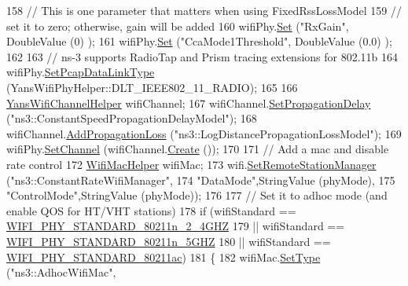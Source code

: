 \begin{DoxyCode}
158   \textcolor{comment}{// This is one parameter that matters when using FixedRssLossModel}
159   \textcolor{comment}{// set it to zero; otherwise, gain will be added}
160   wifiPhy.\hyperlink{classns3_1_1WifiPhyHelper_a2527d6d7b29f717fd7436166c5f05f1a}{Set} (\textcolor{stringliteral}{"RxGain"}, DoubleValue (0) ); 
161   wifiPhy.\hyperlink{classns3_1_1WifiPhyHelper_a2527d6d7b29f717fd7436166c5f05f1a}{Set} (\textcolor{stringliteral}{"CcaMode1Threshold"}, DoubleValue (0.0) );
162 
163   \textcolor{comment}{// ns-3 supports RadioTap and Prism tracing extensions for 802.11b}
164   wifiPhy.\hyperlink{classns3_1_1WifiPhyHelper_ae4b90e90f6e78a19c1b7fdf08b270218}{SetPcapDataLinkType} (YansWifiPhyHelper::DLT\_IEEE802\_11\_RADIO); 
165 
166   \hyperlink{classns3_1_1YansWifiChannelHelper}{YansWifiChannelHelper} wifiChannel;
167   wifiChannel.\hyperlink{classns3_1_1YansWifiChannelHelper_a6b452ba53ccaee6ca000cc72ed9ea0fa}{SetPropagationDelay} (\textcolor{stringliteral}{"ns3::ConstantSpeedPropagationDelayModel"});
168   wifiChannel.\hyperlink{classns3_1_1YansWifiChannelHelper_a71c64d54e148b43698c65736e1c77156}{AddPropagationLoss} (\textcolor{stringliteral}{"ns3::LogDistancePropagationLossModel"});
169   wifiPhy.\hyperlink{classns3_1_1YansWifiPhyHelper_ad2e9a27587dd4ff320435c93cc2676de}{SetChannel} (wifiChannel.\hyperlink{classns3_1_1YansWifiChannelHelper_a0532e292ab9452f3cf630c848708e563}{Create} ());
170 
171   \textcolor{comment}{// Add a mac and disable rate control}
172   \hyperlink{classns3_1_1WifiMacHelper}{WifiMacHelper} wifiMac;
173   wifi.\hyperlink{classns3_1_1WifiHelper_a3d01b178aeb2de246ab5a3aa5638ce24}{SetRemoteStationManager} (\textcolor{stringliteral}{"ns3::ConstantRateWifiManager"},
174                                 \textcolor{stringliteral}{"DataMode"},StringValue (phyMode),
175                                 \textcolor{stringliteral}{"ControlMode"},StringValue (phyMode));
176 
177   \textcolor{comment}{// Set it to adhoc mode (and enable QOS for HT/VHT stations)}
178   \textcolor{keywordflow}{if} (wifiStandard == \hyperlink{group__wifi_gga1299834f4e1c615af3ca738033b76a49a6e449a5ca14fc7c0eb36064ce04a5192}{WIFI\_PHY\_STANDARD\_80211n\_2\_4GHZ}
179       || wifiStandard == \hyperlink{group__wifi_gga1299834f4e1c615af3ca738033b76a49aaabe94a0be4668583c42595437b4a6c0}{WIFI\_PHY\_STANDARD\_80211n\_5GHZ}
180       || wifiStandard == \hyperlink{group__wifi_gga1299834f4e1c615af3ca738033b76a49a7c078959de635b84fb280a955dcfb27e}{WIFI\_PHY\_STANDARD\_80211ac})
181     \{
182       wifiMac.\hyperlink{classns3_1_1WifiMacHelper_a382d8df76a1dd7007179d1963b4b6bc6}{SetType} (\textcolor{stringliteral}{"ns3::AdhocWifiMac"},

\end{DoxyCode}
